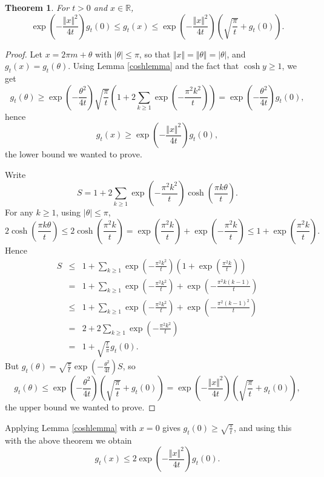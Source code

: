 \documentclass{article}
\newcommand{\norm}[1]{\Vert #1 \Vert}
\newtheorem{theorem}{Theorem}
\begin{document}
\begin{theorem}
For $t>0$ and $x \in \mathbb{R}$,
\[
\exp\left(-\frac{\norm{x}^2}{4t}\right)  g_t(0)  \leq g_t(x) \leq \exp\left(-\frac{\norm{x}^2}{4t}\right) \left( \sqrt{\frac{\pi}{t}} + g_t(0) \right).
\]
\label{gt0}
\end{theorem}
\begin{proof}
Let $x=2\pi m+\theta$ with $|\theta| \leq \pi$, so that $\norm{x}=\norm{\theta}=|\theta|$, and $g_t(x)=g_t(\theta)$.
Using Lemma \ref{coshlemma} and the fact that $\cosh y \geq 1$, we get
\[
g_t(\theta) \geq \exp\left(-\frac{\theta^2}{4t} \right) \sqrt{\frac{\pi}{t}} \left(1+2\sum_{k \geq 1} \exp\left(-\frac{\pi^2 k^2}{t}\right)  \right)
=\exp\left(-\frac{\theta^2}{4t} \right) g_t(0),
\]
hence 
\[
g_t(x) \geq \exp\left(-\frac{\norm{x}^2}{4t} \right) g_t(0),
\]
the lower bound we wanted to prove.

Write
\[
S=1+2\sum_{k \geq 1} \exp\left(-\frac{\pi^2 k^2}{t}\right) \cosh \left( \frac{\pi k \theta}{t} \right).
\]
For any $k \geq 1$, using $|\theta| \leq \pi$,
\[
2\cosh\left(\frac{\pi k \theta}{t} \right) \leq 2\cosh\left( \frac{\pi^2 k}{t} \right) = \exp\left(\frac{\pi^2 k}{t}\right) + \exp\left(-\frac{\pi^2 k}{t} \right)
\leq 1+ \exp\left(\frac{\pi^2 k}{t}\right).
\]
Hence
\begin{eqnarray*}
S&\leq&1+\sum_{k \geq 1} \exp\left(-\frac{\pi^2 k^2}{t}\right) \left(1+ \exp\left(\frac{\pi^2 k}{t}\right) \right)\\
&=&1+\sum_{k \geq 1} \exp\left(-\frac{\pi^2 k^2}{t}\right) + \exp\left(- \frac{\pi^2 k (k-1)}{t} \right)\\
&\leq&1+\sum_{k \geq 1} \exp\left(-\frac{\pi^2 k^2}{t}\right) + \exp\left(- \frac{\pi^2(k-1)^2}{t} \right)\\
&=&2+2\sum_{k \geq 1}  \exp\left(-\frac{\pi^2 k^2}{t}\right)\\
&=&1+\sqrt{\frac{t}{\pi}} g_t(0).
\end{eqnarray*}
But $g_t(\theta)=\sqrt{\frac{\pi}{t}} \exp\left(-\frac{\theta^2}{4t}\right) S$, so
\[
g_t(\theta) \leq \exp\left(-\frac{\theta^2}{4t}\right) \left( \sqrt{\frac{\pi}{t}} + g_t(0) \right)=
\exp\left(-\frac{\norm{x}^2}{4t}\right) \left( \sqrt{\frac{\pi}{t}} + g_t(0) \right),
\]
the upper bound we wanted to prove.
\end{proof}

Applying Lemma \ref{coshlemma} with $x=0$ gives
$g_t(0) \geq \sqrt{\frac{\pi}{t}}$, and using this with the above theorem we obtain
\begin{equation}
g_t(x) \leq 2  \exp\left(-\frac{\norm{x}^2}{4t}\right) g_t(0).
\label{2bound}
\end{equation}
\end{document}
